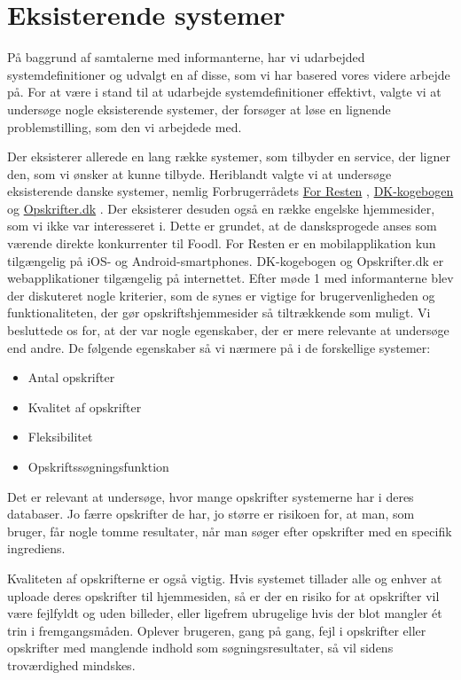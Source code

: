 \section{Eksisterende systemer}
\label{sec:eksisterendesystemer}

På baggrund af samtalerne med informanterne, har vi udarbejded systemdefinitioner og udvalgt en af disse, som vi har basered vores videre arbejde på. For at være i stand til at udarbejde systemdefinitioner effektivt, valgte vi at undersøge nogle eksisterende systemer, der forsøger at løse en lignende problemstilling, som den vi arbejdede med.

Der eksisterer allerede en lang række systemer, som tilbyder en service, der ligner den, som vi ønsker at kunne tilbyde. Heriblandt valgte vi at undersøge  eksisterende danske systemer, nemlig Forbrugerrådets \href{https://play.google.com/store/apps/details?id=com.nodes.forresten}{For Resten} \cite{forresten}, \href{http://www.dk-kogebogen.dk/}{DK-kogebogen} \cite{dkkogebogen} og \href{http://opskrifter.dk/}{Opskrifter.dk} \cite{opskrifterdk}. Der eksisterer desuden også en række engelske hjemmesider, som vi ikke var interesseret i. Dette er grundet, at de dansksprogede anses som værende direkte konkurrenter til Foodl. For Resten er en mobilapplikation kun tilgængelig på iOS- og Android-smartphones. DK-kogebogen og Opskrifter.dk er webapplikationer tilgængelig på internettet. Efter møde 1 med informanterne blev der diskuteret nogle kriterier, som de synes er vigtige for brugervenligheden og funktionaliteten, der gør opskriftshjemmesider så tiltrækkende som muligt. Vi besluttede os for, at der var nogle egenskaber, der er mere relevante at undersøge end andre. De følgende egenskaber så vi nærmere på i de forskellige systemer:

\begin{itemize}[noitemsep]
  \item Antal opskrifter
  \item Kvalitet af opskrifter
  \item Fleksibilitet
  \item Opskriftssøgningsfunktion
\end{itemize}

Det er relevant at undersøge, hvor mange opskrifter systemerne har i deres databaser. Jo færre opskrifter de har, jo større er risikoen for, at man, som bruger, får nogle tomme resultater, når man søger efter opskrifter med en specifik ingrediens. 

Kvaliteten af opskrifterne er også vigtig. Hvis systemet tillader alle og enhver at uploade deres opskrifter til hjemmesiden, så er der en risiko for at opskrifter vil være fejlfyldt og uden billeder, eller ligefrem ubrugelige hvis der blot mangler \'{e}t trin i fremgangsmåden. Oplever brugeren, gang på gang, fejl i opskrifter eller opskrifter med manglende indhold som søgningsresultater, så vil sidens troværdighed mindskes. 


